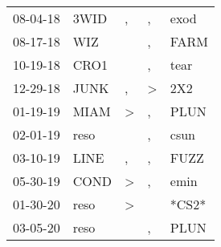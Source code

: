 \begin{supertabular}{p{0.07\textwidth}p{0.06\textwidth}p{0.02\textwidth}p{0.02\textwidth}p{0.06\textwidth}}
 08-04-18\textsuperscript{} &  3WID\textsuperscript{} &                , &                , &           exod\textsuperscript{} \\
 08-17-18\textsuperscript{} &   WIZ\textsuperscript{} &                  &                , &           FARM\textsuperscript{} \\
 10-19-18\textsuperscript{} &  CRO1\textsuperscript{} &                  &                , &           tear\textsuperscript{} \\
 12-29-18\textsuperscript{} &  JUNK\textsuperscript{} &                , &     \textgreater &            2X2\textsuperscript{} \\
 01-19-19\textsuperscript{} &  MIAM\textsuperscript{} &     \textgreater &                , &           PLUN\textsuperscript{} \\
 02-01-19\textsuperscript{} &  reso\textsuperscript{} &                  &                , &           csun\textsuperscript{} \\
 03-10-19\textsuperscript{} &  LINE\textsuperscript{} &                , &                , &           FUZZ\textsuperscript{} \\
 05-30-19\textsuperscript{} &  COND\textsuperscript{} &     \textgreater &                , &           emin\textsuperscript{} \\
 01-30-20\textsuperscript{} &  reso\textsuperscript{} &     \textgreater &                  &                            *CS2* \\
 03-05-20\textsuperscript{} &  reso\textsuperscript{} &                  &                , &           PLUN\textsuperscript{} \\
\end{supertabular}
